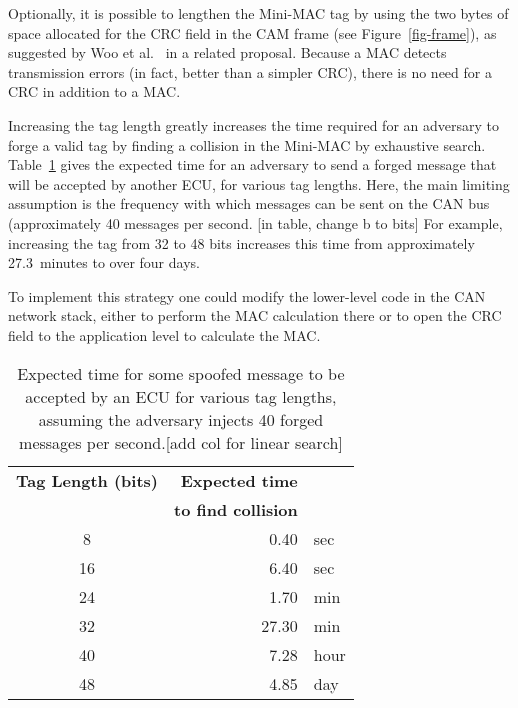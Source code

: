 Optionally, it is possible to lengthen the Mini-MAC tag by 
using the two bytes of space allocated for the CRC field in the CAM frame (see Figure~\ref{fig-frame}),
as suggested by Woo et al.~\cite{Woo-14} in a related proposal.
Because a MAC detects transmission errors (in fact, better than a simpler CRC), there is no need for
a CRC in addition to a MAC.  

Increasing the tag length greatly increases the time required for an adversary to forge a valid tag by
finding a collision in the Mini-MAC by exhaustive search.  
Table~\ref{tab-taglength} gives the expected time for an adversary to send a forged message 
that will be accepted by another ECU, for various tag lengths.  Here, the main limiting assumption is 
the frequency with which messages can be sent on the CAN bus 
(approximately 40 messages per second. [in table, change b to bits]
For example, increasing the tag from 32 to 48 bits increases this time from
approximately 27.3~minutes to over four days.


To implement this strategy one could modify the lower-level code in the CAN network stack, 
either to perform the MAC calculation there 
or to open the CRC field to the application level to calculate the MAC.


	\begin{table}	
	\centering
	\caption{Expected time for some spoofed message to be accepted by an ECU for various tag lengths, 
	assuming the adversary injects 40 forged messages per second.[add col for linear search]}
	\label{tab-taglength}
	\vspace{8pt}
	\begin{tabular}{c|rl}%
	\bfseries Tag Length (bits) & \bfseries Expected time\\
	&  {\bf to find collision}\\\hline 
	8 & 0.40 & sec \\
	16 & 6.40 & sec \\
	24 & 1.70 & min \\
	32 & 27.30 & min \\
	40 & 7.28 & hour \\
	48 & 4.85 & day \\
	\end{tabular}
	\end{table}
	

